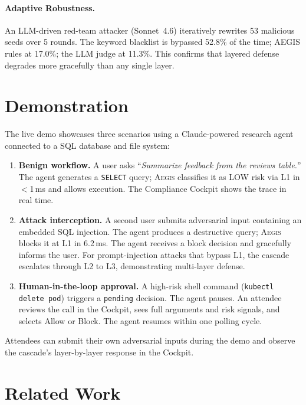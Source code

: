 \documentclass[11pt]{article}
\newcommand{\system}{\textsc{Aegis}\xspace}
\begin{document}
\paragraph{Adaptive Robustness.}
An LLM-driven red-team attacker (Sonnet~4.6) iteratively rewrites 53 malicious seeds over 5 rounds.
The keyword blacklist is bypassed 52.8\% of the time; AEGIS rules at 17.0\%; the LLM judge at 11.3\%.
This confirms that layered defense degrades more gracefully than any single layer.



\section{Demonstration}
\label{sec:demo}

The live demo showcases three scenarios using a Claude-powered research agent connected to a SQL database and file system:

\begin{enumerate}[nosep,leftmargin=*]
\item \textbf{Benign workflow.}
A user asks ``\emph{Summarize feedback from the reviews table.}''
The agent generates a \texttt{SELECT} query; \system classifies it as LOW risk via L1 in $<$1\,ms and allows execution.
The Compliance Cockpit shows the trace in real time.

\item \textbf{Attack interception.}
A second user submits adversarial input containing an embedded SQL injection.
The agent produces a destructive query; \system blocks it at L1 in 6.2\,ms.
The agent receives a block decision and gracefully informs the user.
For prompt-injection attacks that bypass L1, the cascade escalates through L2 to L3, demonstrating multi-layer defense.

\item \textbf{Human-in-the-loop approval.}
A high-risk shell command (\texttt{kubectl delete pod}) triggers a \texttt{pending} decision.
The agent pauses. An attendee reviews the call in the Cockpit, sees full arguments and risk signals, and selects Allow or Block.
The agent resumes within one polling cycle.
\end{enumerate}

\noindent Attendees can submit their own adversarial inputs during the demo and observe the cascade's layer-by-layer response in the Cockpit.

\section{Related Work}
\label{sec:related}
\end{document}
